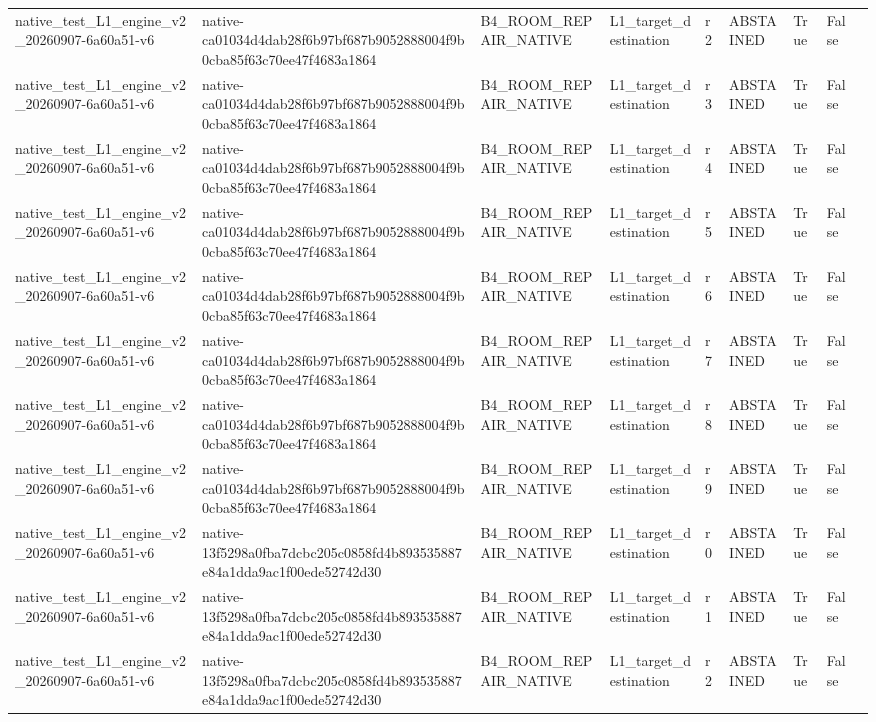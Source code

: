 \begin{tabular}{lllllllll}
native\_test\_L1\_engine\_v2\_20260907-6a60a51-v6 & native-ca01034d4dab28f6b97bf687b9052888004f9b0cba85f63c70ee47f4683a1864 & B4\_ROOM\_REPAIR\_NATIVE & L1\_target\_destination & r2 & ABSTAINED & True & False &  \\
native\_test\_L1\_engine\_v2\_20260907-6a60a51-v6 & native-ca01034d4dab28f6b97bf687b9052888004f9b0cba85f63c70ee47f4683a1864 & B4\_ROOM\_REPAIR\_NATIVE & L1\_target\_destination & r3 & ABSTAINED & True & False &  \\
native\_test\_L1\_engine\_v2\_20260907-6a60a51-v6 & native-ca01034d4dab28f6b97bf687b9052888004f9b0cba85f63c70ee47f4683a1864 & B4\_ROOM\_REPAIR\_NATIVE & L1\_target\_destination & r4 & ABSTAINED & True & False &  \\
native\_test\_L1\_engine\_v2\_20260907-6a60a51-v6 & native-ca01034d4dab28f6b97bf687b9052888004f9b0cba85f63c70ee47f4683a1864 & B4\_ROOM\_REPAIR\_NATIVE & L1\_target\_destination & r5 & ABSTAINED & True & False &  \\
native\_test\_L1\_engine\_v2\_20260907-6a60a51-v6 & native-ca01034d4dab28f6b97bf687b9052888004f9b0cba85f63c70ee47f4683a1864 & B4\_ROOM\_REPAIR\_NATIVE & L1\_target\_destination & r6 & ABSTAINED & True & False &  \\
native\_test\_L1\_engine\_v2\_20260907-6a60a51-v6 & native-ca01034d4dab28f6b97bf687b9052888004f9b0cba85f63c70ee47f4683a1864 & B4\_ROOM\_REPAIR\_NATIVE & L1\_target\_destination & r7 & ABSTAINED & True & False &  \\
native\_test\_L1\_engine\_v2\_20260907-6a60a51-v6 & native-ca01034d4dab28f6b97bf687b9052888004f9b0cba85f63c70ee47f4683a1864 & B4\_ROOM\_REPAIR\_NATIVE & L1\_target\_destination & r8 & ABSTAINED & True & False &  \\
native\_test\_L1\_engine\_v2\_20260907-6a60a51-v6 & native-ca01034d4dab28f6b97bf687b9052888004f9b0cba85f63c70ee47f4683a1864 & B4\_ROOM\_REPAIR\_NATIVE & L1\_target\_destination & r9 & ABSTAINED & True & False &  \\
native\_test\_L1\_engine\_v2\_20260907-6a60a51-v6 & native-13f5298a0fba7dcbc205c0858fd4b893535887e84a1dda9ac1f00ede52742d30 & B4\_ROOM\_REPAIR\_NATIVE & L1\_target\_destination & r0 & ABSTAINED & True & False &  \\
native\_test\_L1\_engine\_v2\_20260907-6a60a51-v6 & native-13f5298a0fba7dcbc205c0858fd4b893535887e84a1dda9ac1f00ede52742d30 & B4\_ROOM\_REPAIR\_NATIVE & L1\_target\_destination & r1 & ABSTAINED & True & False &  \\
native\_test\_L1\_engine\_v2\_20260907-6a60a51-v6 & native-13f5298a0fba7dcbc205c0858fd4b893535887e84a1dda9ac1f00ede52742d30 & B4\_ROOM\_REPAIR\_NATIVE & L1\_target\_destination & r2 & ABSTAINED & True & False &  \\

\end{tabular}
